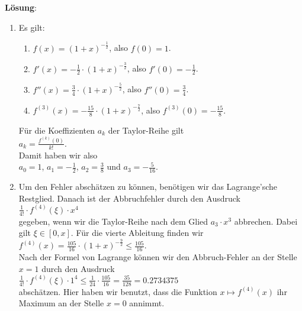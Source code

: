 \documentclass{article}
\newcommand{\ds}{\displaystyle}
\newcommand{\solution}{\vspace*{0.2cm}

\noindent
\textbf{L\"osung}: }
\begin{document}
\solution
\begin{enumerate}
\item Es gilt:
      \begin{enumerate}
      \item $\ds f(x) = (1+x)^{-\frac{1}{2}}$, also $f(0) = 1$. 
      \item $\ds f'(x) = -\frac{1}{2} \cdot (1+x)^{-\frac{3}{2}}$, also $\ds f'(0) = -\frac{1}{2}$. 
      \item $\ds f''(x) = \frac{3}{4} \cdot (1+x)^{-\frac{5}{2}}$, also $\ds f''(0) = \frac{3}{4}$. 
      \item $\ds f^{(3)}(x) = -\frac{15}{8} \cdot (1+x)^{-\frac{7}{2}}$, also $\ds f^{(3)}(0) = -\frac{15}{8}$. 
      \end{enumerate}
      F\"ur die Koeffizienten $a_k$ der Taylor-Reihe gilt
      \\[0.2cm]
      \hspace*{1.3cm}
      $\ds a_k = \frac{f^{(k)}(0)}{k!}$.
      \\[0.2cm]
      Damit haben wir also
      \\[0.2cm]
      \hspace*{1.3cm}
      $\ds a_0 = 1$, \quad 
      $\ds a_1 = -\frac{1}{2}$, \quad 
      $\ds a_2 = \frac{3}{8}$ \quad und \quad
      $\ds a_3 = -\frac{5}{16}$.
\item Um den Fehler absch\"atzen zu k\"onnen, ben\"otigen wir das Lagrange'sche Restglied.  Danach ist der
      Abbruchfehler durch den Ausdruck
      \\[0.2cm]
      \hspace*{1.3cm}
      $\ds \frac{1}{4!} \cdot f^{(4)}(\xi) \cdot x^4$
      \\[0.2cm]
      gegeben, wenn wir die Taylor-Reihe nach dem Glied $a_3 \cdot x^3$ abbrechen.  Dabei gilt $\xi \in [0,x]$.
      F\"ur die vierte Ableitung finden wir
      \\[0.2cm]
      \hspace*{1.3cm}
      $\ds f^{(4)}(x) = \frac{105}{16} \cdot (1+x)^{-\frac{9}{2}} \leq \frac{105}{16}$. 
      \\[0.2cm]
      Nach der Formel von Lagrange k\"onnen wir den Abbruch-Fehler an der Stelle $x=1$ durch den Ausdruck
      \\[0.2cm]
      \hspace*{1.3cm}
      $\ds \frac{1}{4!} \cdot f^{(4)}(\xi) \cdot 1^4 \leq \frac{1}{24} \cdot \frac{105}{16} =
      \frac{35}{128} = 0.2734375$ 
      \\[0.2cm]
      absch\"atzen. Hier haben wir benutzt, dass die Funktion $x \mapsto f^{(4)}(x)$ ihr Maximum an
      der Stelle $x = 0$ annimmt.
      \pagebreak


\end{enumerate}
\end{document}
